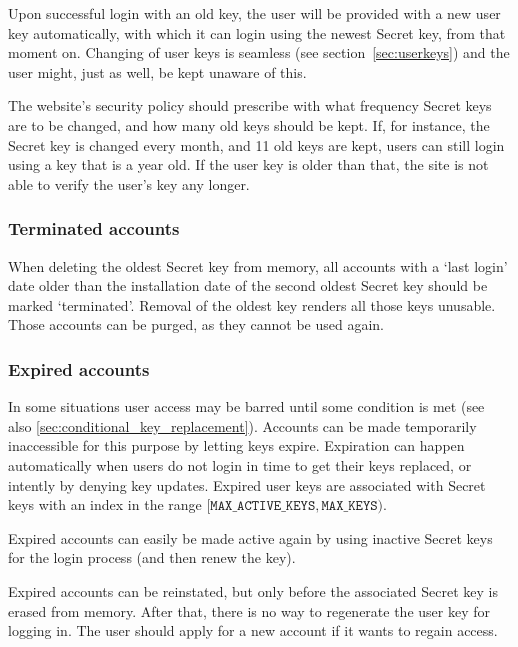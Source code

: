 \par
Upon successful login with an old key,
the user will be provided with a new user key automatically,
with which it can login using the newest Secret key,
from that moment on.
Changing of user keys is seamless
(see section~\vref{sec:userkeys})
and the user might,
just as well,
be kept unaware of this.
\par
The website's security policy should prescribe with what frequency Secret keys are to be changed,
and how many old keys should be kept.
If,
for instance,
the Secret key is changed every month,
and 11 old keys are kept,
users can still login using a key that is a year old.
If the user key is older than that,
the site is not able to verify the user's key any longer.

\subsubsection{Terminated accounts}
When deleting the oldest Secret key from memory,
all accounts with a `last login' date older than the installation
date of the second oldest Secret key should be marked `terminated'.
Removal of the oldest key renders all those keys unusable.
Those accounts can be purged, as they cannot be used again.

\subsubsection{Expired accounts}
In some situations user access may be barred until some condition is met
(see also \vref{sec:conditional_key_replacement}).
Accounts can be made temporarily inaccessible for this purpose by letting keys expire.
Expiration can happen automatically when users do not login in time to get their keys replaced,
or intently by denying key updates.
Expired user keys are associated with Secret keys with an index in the range $[\texttt{MAX\_ACTIVE\_KEYS},\texttt{MAX\_KEYS})$.
\par
Expired accounts can easily be made active again by using inactive Secret keys for the login process (and then renew the key).
\par
Expired accounts can be reinstated,
but only before the associated Secret key is erased from memory.
After that, there is no way to regenerate the user key for logging in.
The user should apply for a new account if it wants to regain access.
